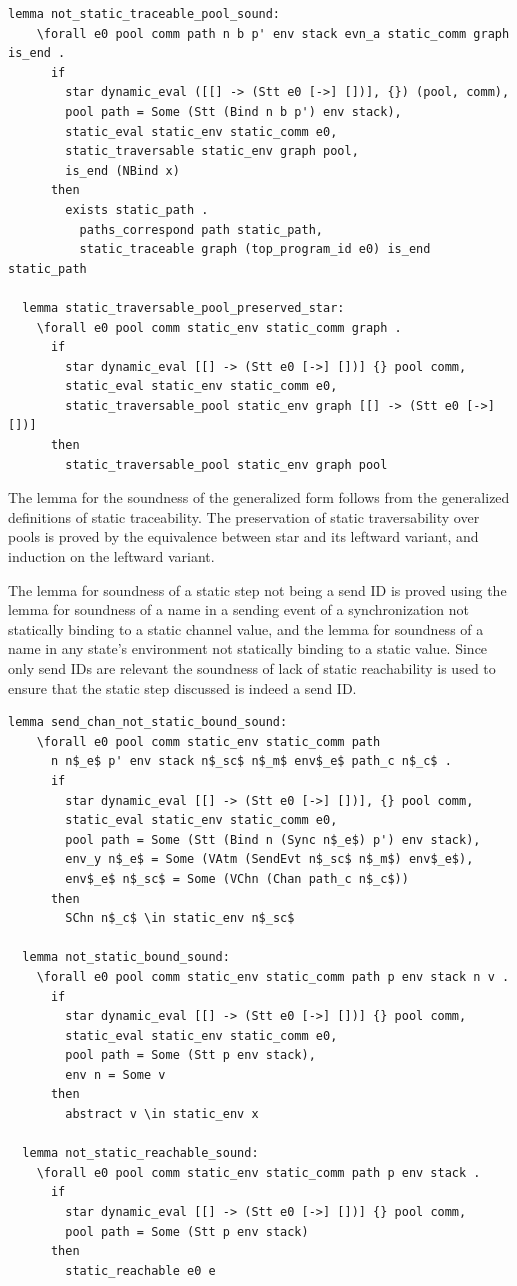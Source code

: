 \documentclass[10pt]{article}
\begin{document}
\begin{lstlisting}[language=logic, mathescape]
  lemma not_static_traceable_pool_sound:
    \forall e0 pool comm path n b p' env stack evn_a static_comm graph is_end .
      if
        star dynamic_eval ([[] -> (Stt e0 [->] [])], {}) (pool, comm), 
        pool path = Some (Stt (Bind n b p') env stack), 
        static_eval static_env static_comm e0, 
        static_traversable static_env graph pool, 
        is_end (NBind x)
      then
        exists static_path . 
          paths_correspond path static_path, 
          static_traceable graph (top_program_id e0) is_end static_path

  lemma static_traversable_pool_preserved_star:
    \forall e0 pool comm static_env static_comm graph .
      if
        star dynamic_eval [[] -> (Stt e0 [->] [])] {} pool comm, 
        static_eval static_env static_comm e0,
        static_traversable_pool static_env graph [[] -> (Stt e0 [->] [])]
      then
        static_traversable_pool static_env graph pool 
\end{lstlisting}


The lemma for the soundness of the generalized form follows from the generalized definitions
of static traceability. The preservation of static traversability over pools is proved by the
equivalence between star and its leftward variant, and induction on the leftward variant.

The lemma for soundness of a static step not being a send ID is proved using the lemma for
soundness of a name in a sending event of a synchronization not statically binding to a static
channel value, and the lemma for soundness of a name in any state's environment
not statically binding to a static value.  Since only send IDs are relevant
the soundness of lack of static reachability is
used to ensure that the static step discussed is indeed a send ID. 

\begin{lstlisting}[language=logic, mathescape]
  lemma send_chan_not_static_bound_sound:
    \forall e0 pool comm static_env static_comm path
      n n$_e$ p' env stack n$_sc$ n$_m$ env$_e$ path_c n$_c$ .
      if
        star dynamic_eval [[] -> (Stt e0 [->] [])], {} pool comm,
        static_eval static_env static_comm e0,
        pool path = Some (Stt (Bind n (Sync n$_e$) p') env stack),
        env_y n$_e$ = Some (VAtm (SendEvt n$_sc$ n$_m$) env$_e$),
        env$_e$ n$_sc$ = Some (VChn (Chan path_c n$_c$))
      then
        SChn n$_c$ \in static_env n$_sc$

  lemma not_static_bound_sound:
    \forall e0 pool comm static_env static_comm path p env stack n v .
      if
        star dynamic_eval [[] -> (Stt e0 [->] [])] {} pool comm,
        static_eval static_env static_comm e0, 
        pool path = Some (Stt p env stack), 
        env n = Some v
      then
        abstract v \in static_env x

  lemma not_static_reachable_sound:
    \forall e0 pool comm static_env static_comm path p env stack .
      if
        star dynamic_eval [[] -> (Stt e0 [->] [])] {} pool comm,
        pool path = Some (Stt p env stack)
      then
        static_reachable e0 e
\end{lstlisting}
\end{document}
